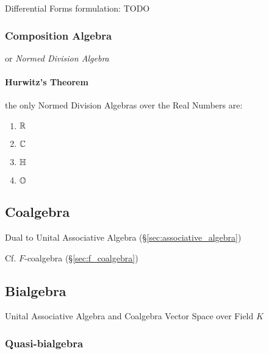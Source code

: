 {{Differential Forms formulation: TODO



\subsubsection{Composition Algebra}\label{sec:composition_algebra}

or \emph{Normed Division Algebra}



\paragraph{Hurwitz's Theorem}\label{sec:hurwitzs_theorem}\hfill

the only Normed Division Algebras over the Real Numbers are:
\begin{enumerate}
  \item $\mathbb{R}$
  \item $\mathbb{C}$
  \item $\mathbb{H}$
  \item $\mathbb{O}$
\end{enumerate}



\subsection{Coalgebra}\label{sec:coalgebra}

Dual to Unital Associative Algebra (\S\ref{sec:associative_algebra})

Cf. $F$-coalgebra (\S\ref{sec:f_coalgebra})



\subsection{Bialgebra}\label{sec:bialgebra}

Unital Associative Algebra and Coalgebra Vector Space over Field $K$



\subsubsection{Quasi-bialgebra}\label{sec:quasi_bialgebra}

}}
